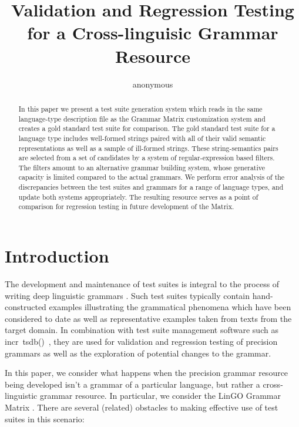\documentclass[11pt]{article}
\title{Validation and Regression Testing for a Cross-linguisic Grammar Resource}
\author{anonymous}
\date{}
\newcommand{\itsdb}{\mbox{\sf \lbrack incr tsdb()\rbrack}}
\begin{document}
\maketitle
\begin{abstract}
  In this paper we present a test suite generation system which reads
  in the same language-type description file as the Grammar Matrix
  customization system and creates a gold standard test suite for
  comparison.  The gold standard test suite for a language type
  includes well-formed strings paired with all of their valid semantic
  representations as well as a sample of ill-formed strings.
  These string-semantics pairs are selected from a set
  of candidates by a system of regular-expression based filters.  The
  filters amount to an alternative grammar building system, whose
  generative capacity is limited compared to the actual grammars.  
  We perform error analysis of the discrepancies between the test suites
  and grammars for a range of language types, and update both systems
  appropriately.  The resulting resource serves as a point of
  comparison for regression testing in future development of the
  Matrix.
\end{abstract}


\section{Introduction}

The development and maintenance of test suites is integral to the
process of writing deep linguistic grammars
\cite{Oep:Fli:98,But:Kin:03}.  Such test suites typically contain
hand-constructed examples illustrating the grammatical phenomena which
have been considered to date as well as representative examples taken
from texts from the target domain.  In combination with test suite
management software such as \itsdb\ \cite{Oepen:01}, they are used for
validation and regression testing of precision grammars as well as the
exploration of potential changes to the grammar.  

In this paper, we consider what happens when the precision grammar
resource being developed isn't a grammar of a particular language, but
rather a cross-linguistic grammar resource.  In particular, we
consider the LinGO Grammar Matrix
\cite{Ben:Fli:Oep:02,Ben:Fli:05,Dre:Ben:05}.  There are several
(related) obstacles to making effective use of test suites in this
scenario:
\end{document}
